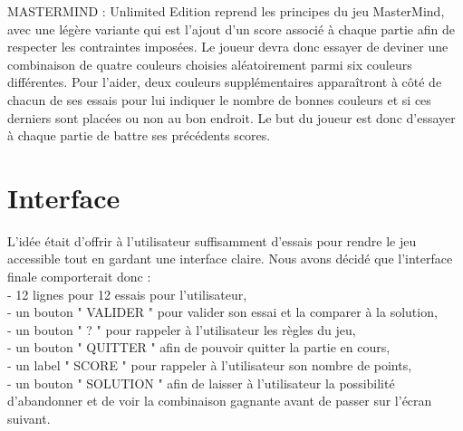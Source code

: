 \documentclass{article}
\begin{document}
MASTERMIND : Unlimited Edition reprend les principes du jeu MasterMind, avec une l\'{e}g\`{e}re variante qui est l'ajout d'un score associ\'{e} \`{a} chaque partie afin de respecter les contraintes impos\'{e}es. Le joueur devra donc essayer de deviner une combinaison de quatre couleurs choisies al\'{e}atoirement parmi six couleurs diff\'{e}rentes. Pour l'aider, deux couleurs suppl\'{e}mentaires appara\^{i}tront \`{a} c\^{o}t\'{e} de chacun de ses essais pour lui indiquer le nombre de bonnes couleurs et si ces derniers sont plac\'{e}es ou non au bon endroit. Le but du joueur est donc d'essayer \`{a} chaque partie de battre ses pr\'{e}c\'{e}dents scores.
\bigskip
\section{Interface}

L'id\'{e}e \'{e}tait d'offrir \`{a} l'utilisateur suffisamment d'essais pour rendre le jeu accessible tout en gardant une interface claire. Nous avons d\'{e}cid\'{e} que l'interface finale comporterait donc :
	 \\ - 12 lignes pour 12 essais pour l'utilisateur, 
	 \\ - un bouton " VALIDER " pour valider son essai et la comparer \`{a} la solution, 
	 \\ - un bouton " ? " pour rappeler \`{a} l'utilisateur les r\`{e}gles du jeu,
	 \\ - un bouton " QUITTER " afin de pouvoir quitter la partie en cours,
	 \\ - un label " SCORE " pour rappeler \`{a} l'utilisateur son nombre de points,
	 \\ - un bouton " SOLUTION " afin de laisser \`{a} l'utilisateur la possibilit\'{e} d'abandonner et de voir la combinaison gagnante avant de passer sur l'\'{e}cran suivant.
\end{document}
